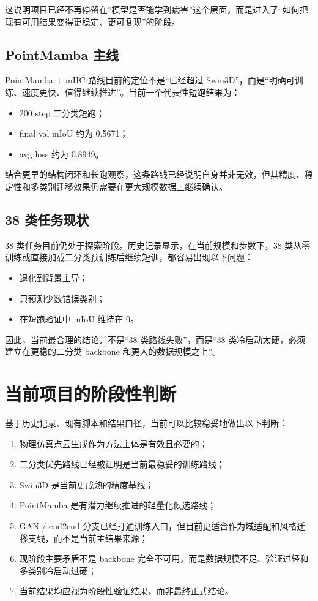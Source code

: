 \documentclass[12pt]{ctexart}
\begin{document}
这说明项目已经不再停留在“模型是否能学到病害”这个层面，而是进入了“如何把现有可用结果变得更稳定、更可复现”的阶段。

\subsection{PointMamba 主线}

PointMamba + mHC 路线目前的定位不是“已经超过 Swin3D”，而是“明确可训练、速度更快、值得继续推进”。当前一个代表性短跑结果为：

\begin{itemize}
  \item 200 step 二分类短跑；
  \item final val mIoU 约为 0.5671；
  \item avg loss 约为 0.8949。
\end{itemize}

结合更早的结构闭环和长跑观察，这条路线已经说明自身并非无效，但其精度、稳定性和多类别迁移效果仍需要在更大规模数据上继续确认。

\subsection{38 类任务现状}

38 类任务目前仍处于探索阶段。历史记录显示，在当前规模和步数下，38 类从零训练或直接加载二分类预训练后继续短训，都容易出现以下问题：

\begin{itemize}
  \item 退化到背景主导；
  \item 只预测少数错误类别；
  \item 在短跑验证中 mIoU 维持在 0。
\end{itemize}

因此，当前最合理的结论并不是“38 类路线失败”，而是“38 类冷启动太硬，必须建立在更稳的二分类 backbone 和更大的数据规模之上”。

\section{当前项目的阶段性判断}

基于历史记录、现有脚本和结果口径，当前可以比较稳妥地做出以下判断：

\begin{enumerate}
  \item 物理仿真点云生成作为方法主体是有效且必要的；
  \item 二分类优先路线已经被证明是当前最稳妥的训练路线；
  \item Swin3D 是当前更成熟的精度基线；
  \item PointMamba 是有潜力继续推进的轻量化候选路线；
  \item GAN / end2end 分支已经打通训练入口，但目前更适合作为域适配和风格迁移支线，而不是当前主结果来源；
  \item 现阶段主要矛盾不是 backbone 完全不可用，而是数据规模不足、验证过轻和多类别冷启动过硬；
  \item 当前结果均应视为阶段性验证结果，而非最终正式结论。
\end{enumerate}
\end{document}
